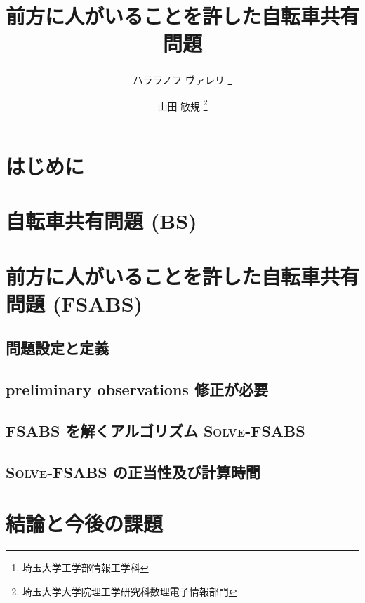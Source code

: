 \documentclass{la-preprint}
\title{前方に人がいることを許した自転車共有問題}
\author{
	ハララノフ ヴァレリ \thanks{埼玉大学工学部情報工学科} \and
	山田 敏規 \thanks{埼玉大学大学院理工学研究科数理電子情報部門} \and
}
\date{}
\begin{document}
\section{はじめに}

\section{自転車共有問題 (BS)}\label{section:bs}

\section{前方に人がいることを許した自転車共有問題 (FSABS) }\label{section:fsabs}
\subsection{問題設定と定義}

\subsection{preliminary observations {\color{red}修正が必要}}

\subsection{FSABS を解くアルゴリズム \textsc{Solve-FSABS}}

\subsection{\textsc{Solve-FSABS} の正当性及び計算時間}

\section{結論と今後の課題}\label{section:conclusion}


\renewcommand{\refname}{参考文献}
\nocite{*}
\printbibliography


\end{document}
